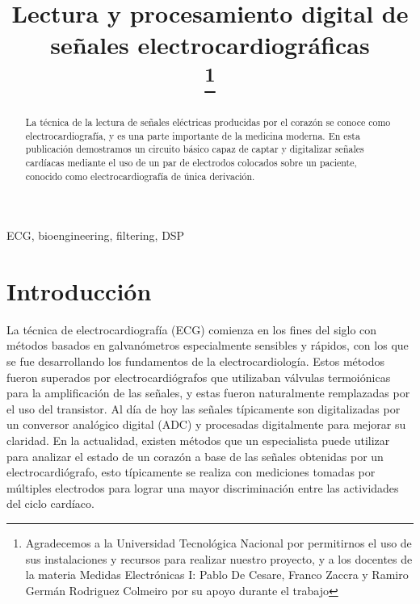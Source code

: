 \documentclass[conference]{IEEEtran}
\begin{document}
 
\title{Lectura y procesamiento digital de señales electrocardiográficas\\
\thanks{Agradecemos a la Universidad Tecnológica Nacional por permitirnos
el uso de sus instalaciones y recursos para realizar nuestro proyecto, y a los
docentes de la materia Medidas Electrónicas I: Pablo De Cesare, Franco Zaccra
y Ramiro Germán Rodriguez Colmeiro por su apoyo durante el trabajo}
}

\author{
\and
{}
}

\maketitle

\begin{abstract}
La técnica de la lectura de señales eléctricas producidas por el corazón se conoce
como electrocardiografía, y es una parte importante de la medicina moderna. En esta
publicación demostramos un circuito básico capaz de captar y digitalizar señales
cardíacas mediante el uso de un par de electrodos colocados sobre un paciente,
conocido como electrocardiografía de única derivación. 
\end{abstract}

\begin{IEEEkeywords}
ECG, bioengineering, filtering, DSP
\end{IEEEkeywords}

\section{Introducción}
 
La técnica de electrocardiografía (ECG) comienza en los fines del siglo  con
métodos basados en galvanómetros especialmente sensibles y rápidos, con los que se
fue desarrollando los fundamentos de la electrocardiología. Estos métodos fueron
superados por electrocardiógrafos que utilizaban válvulas termoiónicas para la
amplificación de las señales, y estas fueron naturalmente remplazadas por el uso
del transistor. Al día de hoy las señales típicamente son digitalizadas por un
conversor analógico digital (ADC) y procesadas digitalmente para mejorar su claridad. 
En la actualidad, existen métodos que un especialista puede utilizar para analizar
el estado de un corazón a base de las señales obtenidas por un electrocardiógrafo,
esto típicamente se realiza con mediciones tomadas por múltiples electrodos para
lograr una mayor discriminación entre las actividades del ciclo cardíaco.
\cite{ecg_history}
\end{document}
